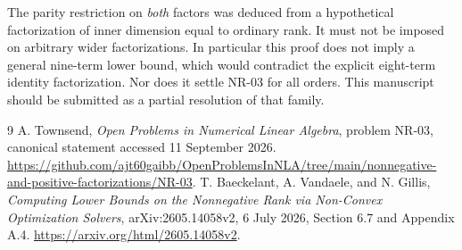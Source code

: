 \documentclass[11pt]{article}
\begin{document}
The parity restriction on \emph{both} factors was deduced from a hypothetical factorization of inner dimension equal to ordinary rank. It must not be imposed on arbitrary wider factorizations. In particular this proof does not imply a general nine-term lower bound, which would contradict the explicit eight-term identity factorization. Nor does it settle NR-03 for all orders. This manuscript should be submitted as a partial resolution of that family.

\begin{thebibliography}{9}
A. Townsend, \emph{Open Problems in Numerical Linear Algebra}, problem NR-03,
canonical statement accessed 11 September 2026.
\url{https://github.com/ajt60gaibb/OpenProblemsInNLA/tree/main/nonnegative-and-positive-factorizations/NR-03}.
T. Baeckelant, A. Vandaele, and N. Gillis,
\emph{Computing Lower Bounds on the Nonnegative Rank via Non-Convex Optimization Solvers},
arXiv:2605.14058v2, 6 July 2026, Section 6.7 and Appendix A.4.
\url{https://arxiv.org/html/2605.14058v2}.
\end{thebibliography}
\end{document}
